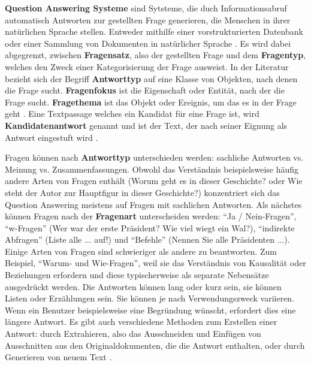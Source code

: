 \documentclass[
        ngerman,
        paper=a4,
        numbers=noendperiod,
]{scrreprt}
\begin{document}
\textbf{Question Answering Systeme} sind Sytsteme, die duch Informationsabruf automatisch Antworten zur gestellten Frage generieren, die Menschen in ihrer natürlichen Sprache stellen. Entweder mithilfe einer vorstrukturierten Datenbank oder einer Sammlung von Dokumenten in natürlicher Sprache \citep{Chali2011ImprovingKernels}\citep{Dwivedi2013ResearchSystem}\citep{Ansari2016IntelligentNetwork}\citep{Lende2016QuestionTechniques}. Es wird dabei abgegrenzt, zwischen \textbf{Fragensatz}, also der gestellten Frage und dem \textbf{Fragentyp}, welches den Zweck einer Kategorisierung der Frage ausweist. In der Literatur bezieht sich der Begriff \textbf{Antworttyp} auf eine Klasse von Objekten, nach denen die Frage sucht. \textbf{Fragenfokus} ist die Eigenschaft oder Entität, nach der die Frage sucht. \textbf{Fragethema} ist das Objekt oder Ereignis, um das es in der Frage geht \citep[S. 2]{CalijorneSoares2018ASystems}. Eine Textpassage welches ein Kandidat für eine Frage ist, wird \textbf{Kandidatenantwort} genannt und ist der Text, der nach seiner Eignung als Antwort eingestuft wird \citep{RetrievalOpen-DomainQuestion-Answering}.

Fragen können nach \textbf{Antworttyp} unterschieden werden: sachliche Antworten vs. Meinung vs. Zusammenfassungen. Obwohl das Verständnis beispielsweise häufig andere Arten von Fragen enthält (Worum geht es in dieser Geschichte? oder Wie steht der Autor zur Hauptfigur in dieser Geschichte?) konzentriert sich das Question Answering meistens auf Fragen mit sachlichen Antworten. Als nächstes können Fragen nach der \textbf{Fragenart} unterscheiden werden: \enquote{Ja / Nein-Fragen}, \enquote{w-Fragen} (Wer war der erste Präsident? Wie viel wiegt ein Wal?), \enquote{indirekte Abfragen} (Liste alle ... auf!) und \enquote{Befehle} (Nennen Sie alle Präsidenten ...). Einige Arten von Fragen sind schwieriger als andere zu beantworten. Zum Beispiel, \enquote{Warum- und Wie-Fragen}, weil sie das Verständnis von Kausalität oder Beziehungen erfordern und diese typischerweise als separate Nebensätze ausgedrückt werden. Die Antworten können lang oder kurz sein, sie können Listen oder Erzählungen sein. Sie können je nach Verwendungszweck variieren. Wenn ein Benutzer beispielsweise eine Begründung wünscht, erfordert dies eine längere Antwort. Es gibt auch verschiedene Methoden zum Erstellen einer Antwort: durch Extrahieren, also das Ausschneiden und Einfügen von Ausschnitten aus den Originaldokumenten, die die Antwort enthalten, oder durch Generieren von neuem Text \citep [S. 277-278]{Hirschman2001NaturalHere}. 
\end{document}

